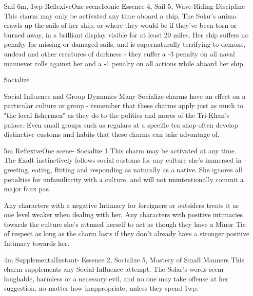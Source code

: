 \begin{Ability}{Sail}
  {6m, 1wp}
  {Reflexive}{One scene}{Iconic}
  {Essence 4, Sail 5, Wave-Riding Discipline}
  This charm may only be activated any time aboard a ship. The Solar's anima crawls up the sails of her ship, or where they would be if they've been torn or burned away, in a brilliant display visible for at least 20 miles. Her ship suffers no penalty for missing or damaged sails, and is supernaturally terrifying to demons, undead and other creatures of darkness - they suffer a -3 penalty on all naval manuever rolls against her and a -1 penalty on all actions while aboard her ship.

\end{Ability}

\begin{Ability}{Socialize}

  \begin{sidebar}{Social Influence and Group Dynamics}
    Many Socialize charms have an effect on a particular culture or group - remember that these charms apply just as much to "the local fishermen" as they do to the politics and mores of the Tri-Khan's palace. Even small groups such as regulars at a specific tea shop often develop distinctive customs and habits that these charms can take advantage of.
  \end{sidebar}

  {5m}
  {Reflexive}{One scene}{-}
  {Socialize 1}
  This charm may be activated at any time. The Exalt instinctively follows social customs for any culture she's immersed in - greeting, eating, flirting and responding as naturally as a native. She ignores all penalties for unfamiliarity with a culture, and will not unintentionally commit a major faux pas.

  Any characters with a negative Intimacy for foreigners or outsiders treats it as one level weaker when dealing with her. Any characters with positive intimacies towards the culture she's attuned herself to act as though they have a Minor Tie of respect as long as the charm lasts if they don't already have a stronger positive Intimacy towards her.

  {4m}
  {Supplemental}{Instant}{-}
  {Essence 2, Socialize 5, Mastery of Small Manners}
  This charm supplements any Social Influence attempt. The Solar's words seem laughable, harmless or a necessary evil, and no one may take offense at her suggestion, no matter how inappropriate, unless they spend 1wp.


\end{Ability}
